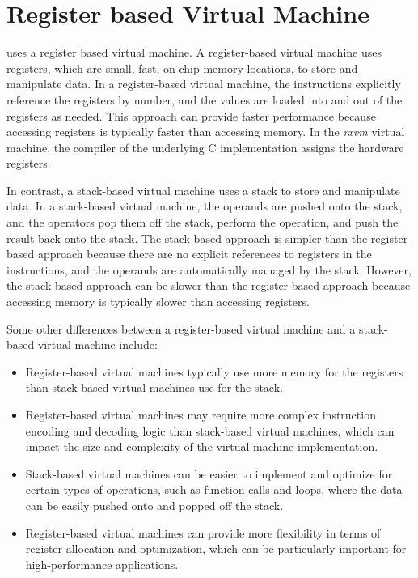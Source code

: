 \section{Register based Virtual Machine}
\crexx{} uses a register based virtual machine.
A register-based virtual machine uses registers, which are small, fast, on-chip memory locations, to store and manipulate data. In a register-based virtual machine, the instructions explicitly reference the registers by number, and the values are loaded into and out of the registers as needed. This approach can provide faster performance because accessing registers is typically faster than accessing memory. In the \emph{rxvm} virtual machine, the compiler of the underlying C implementation assigns the hardware registers.

In contrast, a stack-based virtual machine uses a stack to store and manipulate data. In a stack-based virtual machine, the operands are pushed onto the stack, and the operators pop them off the stack, perform the operation, and push the result back onto the stack. The stack-based approach is simpler than the register-based approach because there are no explicit references to registers in the instructions, and the operands are automatically managed by the stack. However, the stack-based approach can be slower than the register-based approach because accessing memory is typically slower than accessing registers.

Some other differences between a register-based virtual machine and a stack-based virtual machine include:
\begin{itemize}
\item Register-based virtual machines typically use more memory for the registers than stack-based virtual machines use for the stack.
\item Register-based virtual machines may require more complex instruction encoding and decoding logic than stack-based virtual machines, which can impact the size and complexity of the virtual machine implementation.
\item Stack-based virtual machines can be easier to implement and optimize for certain types of operations, such as function calls and loops, where the data can be easily pushed onto and popped off the stack.
\item Register-based virtual machines can provide more flexibility in terms of register allocation and optimization, which can be particularly important for high-performance applications.
\end{itemize}

